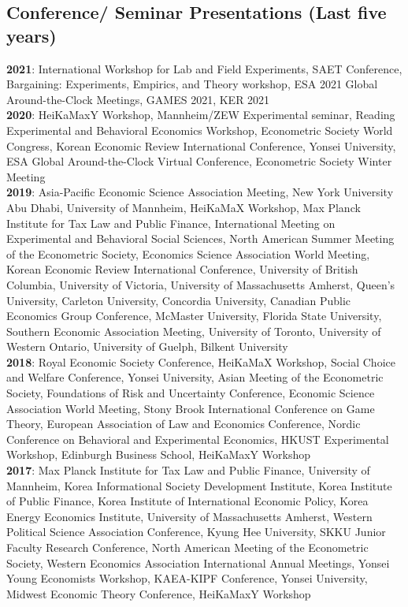 \documentclass[margin, letterpaper]{res}
\begin{document}
\begin{resume}
\section{Conference/ Seminar Presentations (Last five years)}
\textbf{2021}: International Workshop for Lab and Field Experiments, SAET Conference, Bargaining: Experiments, Empirics, and Theory workshop, ESA 2021 Global Around-the-Clock Meetings, GAMES 2021, KER 2021\\%
\textbf{2020}: HeiKaMaxY Workshop, Mannheim/ZEW Experimental seminar, Reading Experimental and Behavioral Economics Workshop, Econometric Society World Congress, Korean Economic Review International Conference, Yonsei University, ESA Global Around-the-Clock Virtual Conference, Econometric Society Winter Meeting\\
\textbf{2019}: Asia-Pacific Economic Science Association Meeting, New York University Abu Dhabi, University of Mannheim, HeiKaMaX Workshop, Max Planck Institute for Tax Law and Public Finance, International Meeting on Experimental and Behavioral Social Sciences, North American Summer Meeting of the Econometric Society, Economics Science Association World Meeting, Korean Economic Review International Conference, University of British Columbia, University of Victoria, University of Massachusetts Amherst, Queen's University, Carleton University, Concordia University, Canadian Public Economics Group Conference, McMaster University, Florida State University, Southern Economic Association Meeting, University of Toronto, University of Western Ontario, University of Guelph, Bilkent University\\
\textbf{2018}: Royal Economic Society Conference, HeiKaMaX Workshop, Social Choice and Welfare Conference, Yonsei University, Asian Meeting of the Econometric Society, Foundations of Risk and Uncertainty Conference, Economic Science Association World Meeting, Stony Brook International Conference on Game Theory, European Association of Law and Economics Conference, Nordic Conference on Behavioral and Experimental Economics, HKUST Experimental Workshop, Edinburgh Business School, HeiKaMaxY Workshop\\
\textbf{2017}: Max Planck Institute for Tax Law and Public Finance, University of Mannheim, Korea Informational Society Development Institute, Korea Institute of Public Finance, Korea Institute of International Economic Policy, Korea Energy Economics Institute, University of Massachusetts Amherst, Western Political Science Association Conference, Kyung Hee University, SKKU Junior Faculty Research Conference, North American Meeting of the Econometric Society, Western Economics Association International Annual Meetings, Yonsei Young Economists Workshop, KAEA-KIPF Conference, Yonsei University, Midwest Economic Theory Conference, HeiKaMaxY Workshop%

\end{resume}
\end{document}

